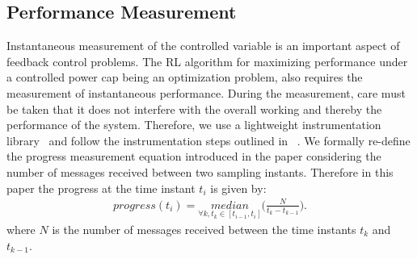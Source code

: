 \fi 

\subsection{Performance Measurement} \label{subsec:Performance_Measurement} Instantaneous measurement of the controlled variable is an important aspect of feedback control problems. The RL algorithm for maximizing performance under a controlled power cap being an optimization problem, also requires the measurement of instantaneous performance. During the measurement, care must be taken that it does not interfere with the overall working and thereby the performance of the system.  Therefore, we use a lightweight instrumentation library~\cite{ramesh2019understanding} and follow the instrumentation steps outlined in ~\cite{cerf2021sustaining}.  We formally re-define the progress measurement equation introduced in the paper \cite{ramesh2019understanding} considering the number of messages received between two sampling instants. Therefore in this paper the progress at the time instant $t_i$ is given by:
 \begin{equation}
    \begin{aligned}
                progress(t_i) = \underset{\forall k,t_k \in [t_{i-1},t_i]}{median}\bigg(\frac{N}{t_k-t_{k-1}} \bigg).
    \end{aligned}
    \label{eq:progress-calculation}
\end{equation}
where $N$ is the number of messages received between the time instants $t_k$ and $t_{k-1}$.


